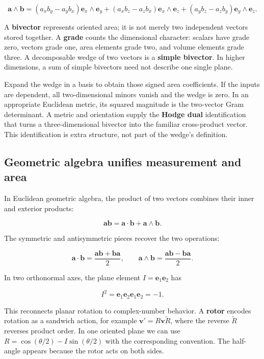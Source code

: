 \[
\mathbf a\wedge\mathbf b
=(a_xb_y-a_yb_x)\mathbf e_x\wedge\mathbf e_y
+(a_xb_z-a_zb_x)\mathbf e_x\wedge\mathbf e_z
+(a_yb_z-a_zb_y)\mathbf e_y\wedge\mathbf e_z.
\]

A \textbf{bivector} represents oriented area; it is not merely two independent vectors stored together. A \textbf{grade} counts the dimensional character: scalars have grade zero, vectors grade one, area elements grade two, and volume elements grade three. A decomposable wedge of two vectors is a \textbf{simple bivector}. In higher dimensions, a sum of simple bivectors need not describe one single plane.

Expand the wedge in a basis to obtain those signed area coefficients. If the inputs are dependent, all two-dimensional minors vanish and the wedge is zero. In an appropriate Euclidean metric, its squared magnitude is the two-vector Gram determinant. A metric and orientation supply the \textbf{Hodge dual} identification that turns a three-dimensional bivector into the familiar cross-product vector. This identification is extra structure, not part of the wedge's definition.

\subsection{Geometric algebra unifies measurement and area}\label{01-foundations-i-ch018-geometric-algebra-unifies-measurement-and-area}

In Euclidean geometric algebra, the product of two vectors combines their inner and exterior products:

\[
\mathbf a\mathbf b=\mathbf a\cdot\mathbf b+\mathbf a\wedge\mathbf b.
\]

The symmetric and antisymmetric pieces recover the two operations:

\[
\mathbf a\cdot\mathbf b=\frac{\mathbf a\mathbf b+\mathbf b\mathbf a}{2},\qquad
\mathbf a\wedge\mathbf b=\frac{\mathbf a\mathbf b-\mathbf b\mathbf a}{2}.
\]

In two orthonormal axes, the plane element \(I=\mathbf e_1\mathbf e_2\) has

\[
I^2=\mathbf e_1\mathbf e_2\mathbf e_1\mathbf e_2=-1.
\]

This reconnects planar rotation to complex-number behavior. A \textbf{rotor} encodes rotation as a sandwich action, for example \(\mathbf v'=R\mathbf v\widetilde R\), where the reverse \(\widetilde R\) reverses product order. In one oriented plane we can use \(R=\cos(\theta/2)-I\sin(\theta/2)\) with the corresponding convention. The half-angle appears because the rotor acts on both sides.

